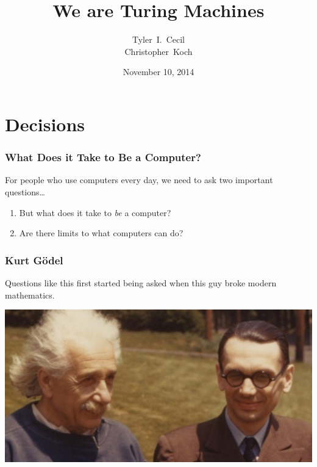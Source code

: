 \documentclass[mathserif]{beamer}
\title{We are Turing Machines}
\author[TC CK]{Tyler~I.~Cecil\\Christopher~Koch}
\institute[New Mexico Tech]{
  Department of Computer Science and Engineering\\
  New Mexico Tech
}
\date{November 10, 2014}
\begin{document}
\frame{\titlepage}

\section{Decisions}
\begin{frame}
  \frametitle{What Does it Take to Be a Computer?}

  For people who use computers every day, we need to ask two important questions\ldots

  \begin{enumerate}
    \item But what does it take to \emph{be} a computer?

    \item Are there limits to what computers can do?
  \end{enumerate}
\end{frame}

\begin{frame}
  \frametitle{Kurt G\"odel}

  Questions like this first started being asked when this guy broke modern
  mathematics.

  \vspace{2ex}
  \centerline{\includegraphics[width=0.8\linewidth]{media/godel.jpg}}
\end{frame}
\end{document}
